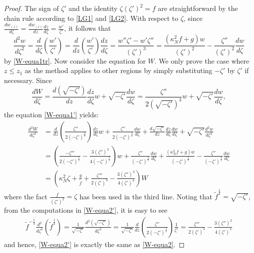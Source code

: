 \documentclass[11pt]{article}
\numberwithin{equation}{section}%
\numberwithin{theorem}{section}
\begin{document}
\begin{proof}
    The sign of $\zeta'$ and the identity $\zeta(\zeta')^2=f$ are straightforward by the chain rule according to \eqref{LG1} and \eqref{LG2}. With respect to $\zeta$, since $\frac{dw_(z)}{d\zeta}=\frac{dw_(z)}{dz}\frac{dz}{d\zeta}=\frac{w'}{\zeta'}$, it follows that
    \begin{equation}\label{W-equa1'}
            \frac{d^2 w}{d\zeta^2}=\frac{d}{d\zeta}\left(\frac{{w}'}{\zeta'}\right)=\frac{d}{d z}\left(\frac{{w}'}{\zeta'}\right)\frac{dz}{d\zeta}=\frac{w''\zeta'-w'\zeta''}{(\zeta')^3}=\frac{(\kappa_N^2f+g)w}{(\zeta')^2}-\frac{\zeta''}{(\zeta')^2}\frac{dw}{d\zeta}
    \end{equation}
    by \eqref{W-equa1tr}. Now consider the equation for $W$. We only prove the case where $z\le z_1$ as the method applies to other regions by simply substituting $-\zeta'$ by $\zeta'$ if necessary. Since
    \begin{equation*}
        \frac{dW}{d\zeta}=\frac{d\left(\sqrt{-\zeta'}\right)}{dz}\frac{dz}{d\zeta}w+\sqrt{-\zeta'}\frac{dw}{d\zeta}=\frac{\zeta''}{2(\sqrt{-\zeta'})^3}w+\sqrt{-\zeta'}\frac{dw}{d\zeta},
    \end{equation*}
   the equation \eqref{W-equa1'} yields:
    \begin{equation}\label{W-equa2'}
        \begin{split}
            \frac{d^2W}{d\zeta^2}&=\frac{d}{dz}\left(\frac{\zeta''}{2(-\zeta')^\frac{3}{2}}\right)\frac{dz}{d\zeta}w+\frac{\zeta''}{2(-\zeta')^\frac{3}{2}}\frac{dw}{d\zeta}+\frac{d\sqrt{-\zeta'}}{dz}\frac{dz}{d\zeta}\frac{dw}{d\zeta}+\sqrt{-\zeta'}\frac{d^2w}{d\zeta^2}\\
            &=\left(\frac{-\zeta'''}{2(-\zeta')^\frac{5}{2}}-\frac{3(\zeta'')^2}{4(-\zeta')^\frac{7}{2}}\right)w+\frac{\zeta''}{(-\zeta')^\frac{3}{2}}\frac{dw}{d\zeta}+\frac{(\kappa^2_Nf+g)w}{(-\zeta')^\frac{3}{2}}-\frac{\zeta''}{(-\zeta')^\frac{3}{2}}\frac{dw}{d\zeta}\\
            &=\left(\kappa_N^2\zeta+\frac{g}{\tilde{f}}+\frac{\zeta'''}{2(\zeta')^3}-\frac{3(\zeta'')^2}{4(\zeta')^4}\right)W
        \end{split}
    \end{equation}
    where the fact $\frac{f}{(\zeta')^2}=\zeta$ has been used in the third line. Noting that $\tilde{f}^\frac{1}{4}=\sqrt{-\zeta'}$, from the computations in \eqref{W-equa2'}, it is easy to see
    \begin{equation*}
        \begin{split}
            \tilde{f}^{-\frac{1}{4}}\frac{d^2}{d\zeta^2}\left(\tilde{f}^\frac{1}{4}\right)=\frac{1}{\sqrt{-\zeta'}}\frac{d^2(\sqrt{-\zeta'})}{d\zeta^2}=\frac{1}{\sqrt{-\zeta'}}\frac{d}{dz}\left(\frac{\zeta''}{2(-\zeta')^\frac{3}{2}}\right)\frac{1}{\zeta'}=\frac{\zeta'''}{2(\zeta')^3}-\frac{3(\zeta'')^2}{4(\zeta')^4}
        \end{split}
    \end{equation*}
    and hence, \eqref{W-equa2'} is exactly the same as \eqref{W-equa2}.
\end{proof}
\end{document}
